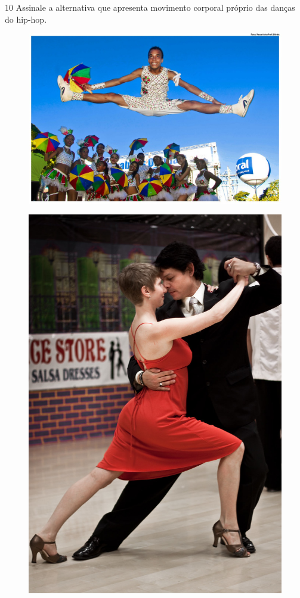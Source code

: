\num{10} Assinale a alternativa que apresenta movimento corporal próprio das danças do hip-hop.

\begin{figure}[htpb!]
\includegraphics[width=.5\textwidth]{./imgs/art35a.jpg}
\end{figure}
\begin{figure}[htpb!]
\includegraphics[width=.5\textwidth]{./imgs/art35b.jpg}
\end{figure}

